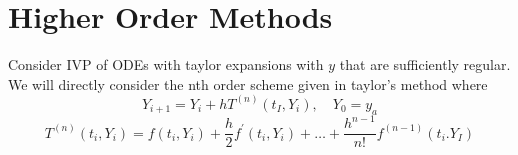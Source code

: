 \section{Higher Order Methods}
Consider IVP of ODEs with taylor expansions with \(y\) that are sufficiently regular. 
We will directly consider the nth order scheme given in taylor's method where 
\[
    Y_{i+1} = Y_i + h T^{(n)} (t_I, Y_i), \quad Y_0 = y_a
\]
\[
    T^{(n)} (t_i, Y_i) = f(t_i, Y_i) + \frac{h}{2} f^{\prime} (t_i,Y_i) + \dots  + 
    \frac{h^{n-1} }{n!} f^{(n-1)}(t_i. Y_I)
\]